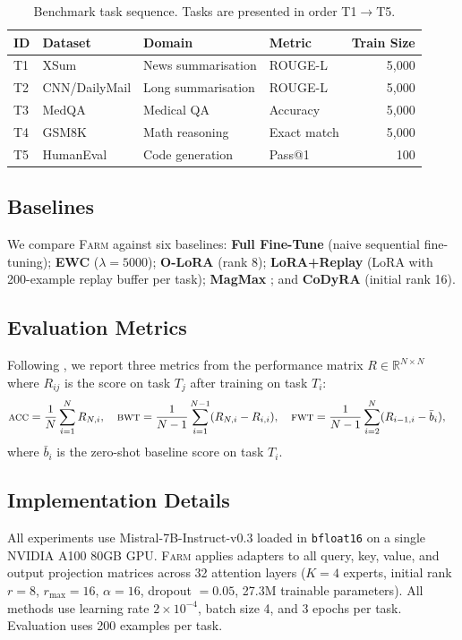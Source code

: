 \documentclass{article}
\newcommand{\FARM}{\textsc{Farm}}
\newcommand{\ACC}{\textsc{acc}}
\newcommand{\BWT}{\textsc{bwt}}
\newcommand{\FWT}{\textsc{fwt}}
\begin{document}
\begin{table}[h]
\centering
\caption{Benchmark task sequence. Tasks are presented in order T1$\to$T5.}
\label{tab:tasks}
\small
\begin{tabular}{llllr}
\toprule
\textbf{ID} & \textbf{Dataset} & \textbf{Domain} & \textbf{Metric} & \textbf{Train Size} \\
\midrule
T1 & XSum \citep{narayan2018don}           & News summarisation   & ROUGE-L & 5,000 \\
T2 & CNN/DailyMail \citep{see2017get}      & Long summarisation   & ROUGE-L & 5,000 \\
T3 & MedQA \citep{jin2021disease}          & Medical QA           & Accuracy & 5,000 \\
T4 & GSM8K \citep{cobbe2021training}       & Math reasoning       & Exact match & 5,000 \\
T5 & HumanEval \citep{chen2021evaluating}  & Code generation      & Pass@1  & 100   \\
\bottomrule
\end{tabular}
\end{table}

\subsection{Baselines}
We compare \FARM{} against six baselines: \textbf{Full Fine-Tune} (naive sequential fine-tuning); \textbf{EWC} \citep{kirkpatrick2017overcoming} ($\lambda = 5000$); \textbf{O-LoRA} \citep{wang2023orthogonal} (rank 8); \textbf{LoRA+Replay} (LoRA with 200-example replay buffer per task); \textbf{MagMax} \citep{marczak2024magmax}; and \textbf{CoDyRA} \citep{zhang2024codyre} (initial rank 16).

\subsection{Evaluation Metrics}
Following \citet{lopez2017gradient}, we report three metrics from the performance matrix $R \in \mathbb{R}^{N \times N}$ where $R_{ij}$ is the score on task $T_j$ after training on task $T_i$:
\begin{align}
\ACC &= \frac{1}{N} \sum_{i=1}^N R_{N,i}, \quad
\BWT = \frac{1}{N-1} \sum_{i=1}^{N-1} (R_{N,i} - R_{i,i}), \quad
\FWT = \frac{1}{N-1} \sum_{i=2}^{N} (R_{i-1,i} - \bar{b}_i),
\end{align}
where $\bar{b}_i$ is the zero-shot baseline score on task $T_i$.

\subsection{Implementation Details}
All experiments use Mistral-7B-Instruct-v0.3 \citep{jiang2023mistral} loaded in \texttt{bfloat16} on a single NVIDIA A100 80GB GPU. \FARM{} applies adapters to all query, key, value, and output projection matrices across 32 attention layers ($K=4$ experts, initial rank $r=8$, $r_{\max}=16$, $\alpha=16$, dropout $= 0.05$, 27.3M trainable parameters). All methods use learning rate $2 \times 10^{-4}$, batch size 4, and 3 epochs per task. Evaluation uses 200 examples per task.
\end{document}
